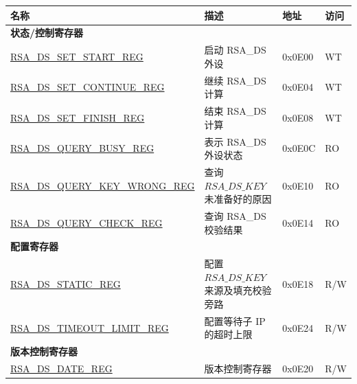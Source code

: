 \begin{longtable}{ | p{6cm} | p{7.2cm} | p{1.3cm} | p{1cm} | }
\hline\rowcolor{lightgray}
\textbf{名称} & \textbf{描述} &  \textbf{地址} & \textbf{访问} \\ \hline
\endhead
\multicolumn{4}{|l|}{\textbf{状态/控制寄存器}} \\ \hline
\hyperref[regdesc:RSADSSETSTARTREG]{RSA\_DS\_SET\_START\_REG} & 启动 RSA\_DS 外设 & 0x0E00 & WT \\ \hline
\hyperref[regdesc:RSADSSETCONTINUEREG]{RSA\_DS\_SET\_CONTINUE\_REG} & 继续 RSA\_DS 计算 & 0x0E04 & WT \\ \hline
\hyperref[regdesc:RSADSSETFINISHREG]{RSA\_DS\_SET\_FINISH\_REG} & 结束 RSA\_DS 计算 & 0x0E08 & WT \\ \hline
\hyperref[regdesc:RSADSQUERYBUSYREG]{RSA\_DS\_QUERY\_BUSY\_REG} & 表示 RSA\_DS 外设状态 & 0x0E0C & RO \\ \hline
\hyperref[regdesc:RSADSQUERYKEYWRONGREG]{RSA\_DS\_QUERY\_KEY\_WRONG\_REG} & 查询 \begin{math}RSA\_DS\_KEY\end{math} 未准备好的原因 & 0x0E10 & RO \\ \hline
\hyperref[regdesc:RSADSQUERYCHECKREG]{RSA\_DS\_QUERY\_CHECK\_REG} & 查询 RSA\_DS 校验结果 & 0x0E14 & RO \\ \hline
\multicolumn{4}{|l|}{\textbf{配置寄存器}} \\ \hline
\hyperref[regdesc:RSADSSTATICREG]{RSA\_DS\_STATIC\_REG} & 配置 \begin{math}RSA\_DS\_KEY\end{math} 来源及填充校验旁路 & 0x0E18 & R/W \\ \hline
\hyperref[regdesc:RSADSTIMEOUTLIMITREG]{RSA\_DS\_TIMEOUT\_LIMIT\_REG} & 配置等待子 IP 的超时上限 & 0x0E24 & R/W \\ \hline
\multicolumn{4}{|l|}{\textbf{版本控制寄存器}} \\ \hline
\hyperref[regdesc:RSADSDATEREG]{RSA\_DS\_DATE\_REG} & 版本控制寄存器 & 0x0E20 & R/W \\ \hline
\end{longtable}
